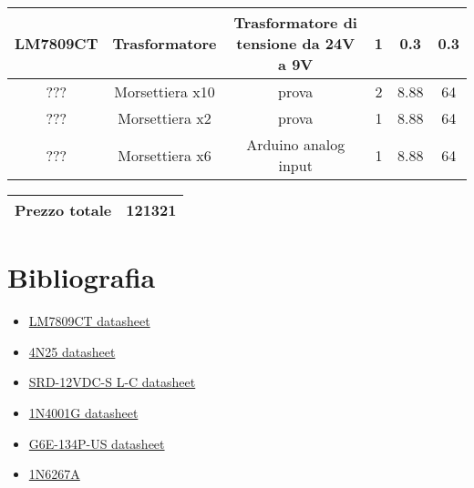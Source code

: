 \documentclass{article}
\begin{document}
\begin{center}
\begin{tabular}{| c | c | c | c| c |c|}
        \hline
        \rowcolor{Peach} LM7809CT & Trasformatore  & Trasformatore di tensione da 24V a 9V & 1 & 0.3 & 0.3\\
        \hline
        \rowcolor{Apricot} ??? & Morsettiera x10 & prova & 2 & 8.88 & 64\\
        \hline
        \rowcolor{Peach} ??? & Morsettiera x2 & prova & 1 & 8.88 & 64\\
        \hline
        \rowcolor{Apricot} ??? & Morsettiera x6 & Arduino analog input & 1 & 8.88 & 64\\
        \hline
   \end{tabular}
   \vskip 2mm
   \begin{tabular}[h]{|c|c|}
       \hline
        \rowcolor{BurntOrange} Prezzo totale & 121321\\
       \hline
   \end{tabular}
   \end{center}
   \section{Bibliografia}
   \begin{itemize}
       \item \href{https://datasheetspdf.com/pdf/766811/ThinkiSemiconductor/LM78XX/1}{LM7809CT datasheet}
       \item \href{https://www.alldatasheet.com/datasheet-pdf/pdf/2846/MOTOROLA/4N25.html}{4N25 datasheet}
       \item \href{https://www.alldatasheet.com/datasheet-pdf/pdf/1131947/SONGLERELAY/SRD12VDCSLC.html}{SRD-12VDC-S L-C datasheet}
       \item \href{https://it.farnell.com/on-semiconductor/1n4001g/diodo-standard-1a-do-41/dp/1458986?gclid=CjwKCAjwqcKFBhAhEiwAfEr7zUiXu7byYKAv4I9jzqX1HOrYwDHbs8iKbdpKXM1QnqVZ_xLJMfnMjxoCd9kQAvD_BwE&mckv=s_dc|pcrid|522005845083|kword|1n4001g|match|p|plid||slid||product||pgrid|122762829255|ptaid|kwd-10795764537|&CMP=KNC-GIT-GEN-SKU-MDC-Semiconductors}{1N4001G datasheet}
       \item \href{https://omronfs.omron.com/en_US/ecb/products/pdf/en-g6e.pdf}{G6E-134P-US datasheet}
       \item \href{http://www.farnell.com/datasheets/2240125.pdf}{1N6267A}
   \end{itemize}
\end{document}
